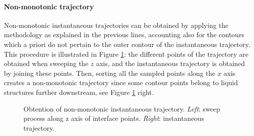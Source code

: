 
\paragraph*{{Non-monotonic trajectory}} 

Non-monotonic instantaneous trajectories can be obtained by applying the methodology as explained in the previous lines, accounting also for the contours which a priori do not pertain to the outer contour of the instantaneous trajectory. This procedure is illustrated in Figure \ref{fig:trajectory_obtention_instantaneous_method_a}: the different points of the trajectory are obtained when sweeping the $z$ axis, and the instantaneous trajectory is obtained by joining these points. Then, sorting all the sampled points along the $x$ axis creates a non-monotonic trajectory since some contour points belong to liquid structures further downstream, see Figure \ref{fig:trajectory_obtention_instantaneous_method_a} right.

\begin{figure}[ht]
     \centering
     \begin{subfigure}[b]{0.45\textwidth}
         \centering
     \end{subfigure}
     \begin{subfigure}[b]{0.45\textwidth}
         \centering
     \end{subfigure}
        \caption[Obtention of non-monotonic instantaneous trajectory]{Obtention of non-monotonic instantaneous trajectory. \textsl{Left}: sweep process along z axis of interface points. \textsl{Right}: instantaneous trajectory.}
        \label{fig:trajectory_obtention_instantaneous_method_a}
\end{figure}


\clearpage

